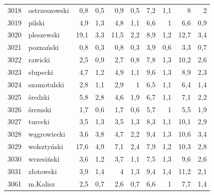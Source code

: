 \begin{center}
\begin{longtable}{lp{3cm}rrrrrrrr}
3018 & ostrzeszowski           & 0,8     & 0,5         & 0,9      & 0,5          & 7,2      & 1,1          & 8        & 2            \\
3019 & pilski                  & 4,9     & 1,3         & 4,8      & 1,1          & 6,6      & 1            & 6,6      & 0,9          \\
3020 & pleszewski              & 19,1    & 3,3         & 11,5     & 2,2          & 8,9      & 1,2          & 12,7     & 3,4          \\
3021 & poznański               & 0,8     & 0,3         & 0,8      & 0,3          & 3,9      & 0,6          & 3,3      & 0,7          \\
3022 & rawicki                 & 2,5     & 0,9         & 2,7      & 0,8          & 7,8      & 1,3          & 10,2     & 2,6          \\
3023 & słupecki                & 4,7     & 1,2         & 4,9      & 1,1          & 9,6      & 1,3          & 8,9      & 2,3          \\
3024 & szamotulski             & 2,8     & 1,1         & 2,9      & 1            & 6,5      & 1,1          & 6,4      & 1,4          \\
3025 & średzki                 & 5,8     & 2,8         & 4,6      & 1,9          & 6,7      & 1,1          & 7,1      & 2,2          \\
3026 & śremski                 & 1,7     & 0,6         & 1,7      & 0,6          & 5,7      & 1            & 5,5      & 1,9          \\
3027 & turecki                 & 3,5     & 1,3         & 3,5      & 1,3          & 8,3      & 1,1          & 10,1     & 2,9          \\
3028 & wągrowiecki             & 3,6     & 3,8         & 4,7      & 2,2          & 9,4      & 1,3          & 10,6     & 3,4          \\
3029 & wolsztyński             & 17,6    & 4,9         & 7,1      & 2,4          & 7,9      & 1,2          & 10,3     & 2,8          \\
3030 & wrzesiński              & 3,6     & 1,2         & 3,7      & 1,1          & 7,5      & 1,3          & 9,6      & 2,6          \\
3031 & złotowski               & 3,9     & 1,4         & 4        & 1,3          & 9,4      & 1,4          & 11,2     & 2,1          \\
3061 & m.Kalisz                & 2,5     & 0,7         & 2,6      & 0,7          & 6,6      & 1            & 7,7      & 1,4          \\

\end{longtable}
\end{center}
